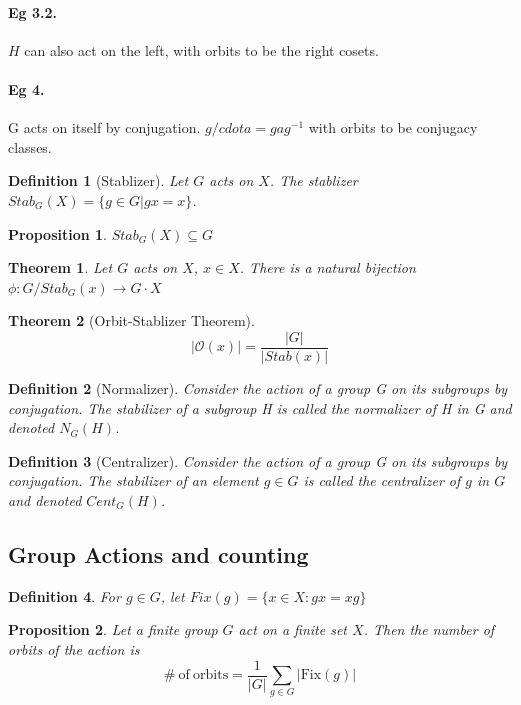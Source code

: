\documentclass[12pt]{article}
\newtheorem{definition}{Definition}[subsection]
\newtheorem{theorem}{Theorem}[subsection]
\newtheorem{proposition}{Proposition}[subsection]
\begin{document}
		\paragraph{Eg 3.2.}$H$ can also act on the left, with orbits to be the right cosets.
		
		\paragraph{Eg 4.} G acts on itself by conjugation. $g /cdot a = gag^{-1}$ with orbits to be conjugacy classes.
		\begin{definition}[Stablizer]
			Let $G$ acts on $X$. The stablizer $Stab_G(X) = \{g \in G| gx = x\}$.
		\end{definition}
		\begin{proposition}
			$Stab_G(X) \subseteq G$
		\end{proposition}
		
		\begin{theorem}
			Let $G$ acts on $X$,  $x \in X$. There is a natural bijection $\phi: G / Stab_G(x) \rightarrow G \cdot X$
		\end{theorem}
		
		\begin{theorem}[Orbit-Stablizer Theorem]
			\[|\mathcal{O}(x)| = \frac{|G|}{|Stab(x)|}\]
		\end{theorem}
		
		\begin{definition}[Normalizer]
			Consider the action of a group G on its subgroups by conjugation. The stabilizer of a subgroup H is called the normalizer of H in G and denoted $N_G(H)$.
		\end{definition}
		
		\begin{definition}[Centralizer]
			Consider the action of a group G on its subgroups by conjugation. The stabilizer of an element $g \in G$ is called the centralizer of $g$ in $G$ and denoted $Cent_G(H)$.
		\end{definition}
		
		\subsection{Group Actions and counting}
		
		\begin{definition}
			For $g \in G$, let $Fix(g) = \{x \in X : gx = xg\}$
		\end{definition}
		
		\begin{proposition}
			Let a finite group $G$ act on a finite set $X$. Then the number of orbits of the action is
			\[\mathrm{\#\ of\ orbits} = \frac{1}{|G|} \sum_{g \in G}|\mathrm{Fix}(g)|\]
		\end{proposition}
		
\end{document}
